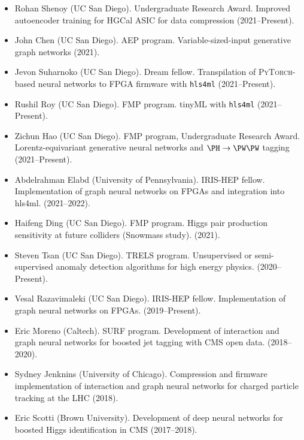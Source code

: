\documentclass[11pt]{res}
\begin{document}
\begin{resume}
\begin{itemize}
    \item Rohan Shenoy (UC San Diego). Undergraduate Research Award. Improved autoencoder training for HGCal ASIC for data compression ({2021--Present}).
    \item John Chen (UC San Diego). AEP program. Variable-sized-input generative graph networks ({2021}).
    \item Jevon Suharnoko (UC San Diego). Dream fellow. Transpilation of \textsc{PyTorch}-based neural networks to FPGA firmware with \texttt{hls4ml} ({2021--Present}).
    \item Rushil Roy (UC San Diego). FMP program. tinyML with \texttt{hls4ml} ({2021--Present}).
    \item Zichun Hao (UC San Diego). FMP program, Undergraduate Research Award. Lorentz-equivariant generative neural networks and $\PH\to\PW\PW$ tagging ({2021--Present}).
    \item Abdelrahman Elabd (University of Pennsylvania). IRIS-HEP fellow. Implementation of graph neural networks on FPGAs and integration into hls4ml. ({2021--2022}).
    \item Haifeng Ding (UC San Diego). FMP program. Higgs pair production sensitivity at future colliders (Snowmass study). ({2021}).
    \item Steven Tsan (UC San Diego). TRELS program. Unsupervised or semi-supervised anomaly detection algorithms for high energy physics. ({2020--Present}).
    \item Vesal Razavimaleki (UC San Diego). IRIS-HEP fellow. Implementation of graph neural networks on FPGAs. ({2019--Present}).
    \item Eric Moreno (Caltech). SURF program. Development of interaction and graph neural networks for boosted jet tagging with CMS open data. ({2018--2020}).
    \item Sydney Jenknins (University of Chicago). Compression and firmware implementation of interaction and graph neural networks for charged particle tracking at the LHC ({2018}).
    \item Eric Scotti (Brown University). Development of deep neural networks for boosted Higgs identification in CMS ({2017--2018}).
\end{itemize}
\end{resume}
\end{document}
